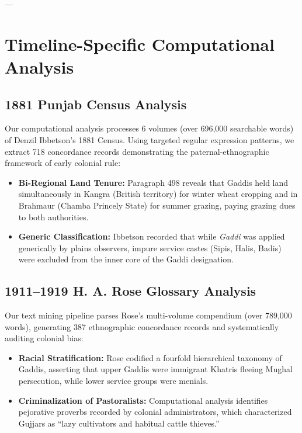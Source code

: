 \documentclass[11pt,a4paper]{article}
\begin{document}
---

\section{Timeline-Specific Computational Analysis}

\subsection{1881 Punjab Census Analysis}
Our computational analysis processes 6 volumes (over 696,000 searchable words) of Denzil Ibbetson's 1881 Census. Using targeted regular expression patterns, we extract 718 concordance records demonstrating the paternal-ethnographic framework of early colonial rule:
\begin{itemize}[leftmargin=*]
    \item \textbf{Bi-Regional Land Tenure:} Paragraph 498 reveals that Gaddis held land simultaneously in Kangra (British territory) for winter wheat cropping and in Brahmaur (Chamba Princely State) for summer grazing, paying grazing dues to both authorities.
    \item \textbf{Generic Classification:} Ibbetson recorded that while \textit{Gaddi} was applied generically by plains observers, impure service castes (Sipis, Halis, Badis) were excluded from the inner core of the Gaddi designation.
\end{itemize}

\subsection{1911--1919 H. A. Rose Glossary Analysis}
Our text mining pipeline parses Rose's multi-volume compendium (over 789,000 words), generating 387 ethnographic concordance records and systematically auditing colonial bias:
\begin{itemize}[leftmargin=*]
    \item \textbf{Racial Stratification:} Rose codified a fourfold hierarchical taxonomy of Gaddis, asserting that upper Gaddis were immigrant Khatris fleeing Mughal persecution, while lower service groups were menials.
    \item \textbf{Criminalization of Pastoralists:} Computational analysis identifies pejorative proverbs recorded by colonial administrators, which characterized Gujjars as ``lazy cultivators and habitual cattle thieves.''
\end{itemize}
\end{document}
